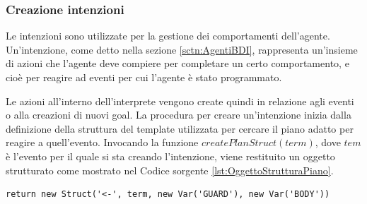 \subsubsection{Creazione intenzioni}
Le intenzioni sono utilizzate per la gestione dei comportamenti dell'agente. Un'intenzione, come detto nella sezione \ref{sctn:AgentiBDI}, rappresenta un'insieme di azioni che l'agente deve compiere per completare un certo comportamento, e cioè per reagire ad eventi per cui l'agente è stato programmato.

Le azioni all'interno dell'interprete vengono create quindi in relazione agli eventi o alla creazioni di nuovi goal.
La procedura per creare un'intenzione inizia dalla definizione della struttura del template utilizzata per cercare il piano adatto per reagire a quell'evento. Invocando la funzione $createPlanStruct(term)$, dove $tem$ è l'evento per il quale si sta creando l'intenzione, viene restituito un oggetto strutturato come mostrato nel Codice sorgente \ref{lst:OggettoStrutturaPiano}.
\medskip
\begin{lstlisting}[firstnumber=1,label={lst:OggettoStrutturaPiano},caption={Oggetto che definisce la struttura del piano}]
return new Struct('<-', term, new Var('GUARD'), new Var('BODY'))
\end{lstlisting}

